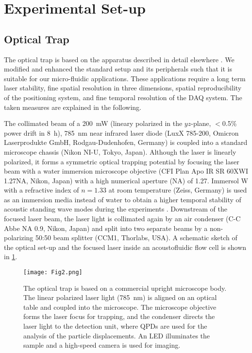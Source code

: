 \section{Experimental Set-up\label{sec:VT-experimentalSetUp}}
\subsection{Optical Trap\label{sec:VT-opticalTrap}}

The optical trap is based on the apparatus described in detail elsewhere 
\cite{Bodensiek}. We modified and enhanced the standard setup and its 
peripherals such that it is suitable for our micro-fluidic applications. These 
applications require a long term laser stability, fine spatial resolution in 
three dimensions, spatial reproducibility of the positioning system, and fine 
temporal resolution of the DAQ system. The taken measures are explained in the 
following.

The collimated beam of a \SI{200}{\milli\watt} (lineary polarized in the 
$yz$-plane, $<$0.5\% power drift in \SI{8}{\hour}), \SI{785}{\nano\meter} near 
infrared laser diode (LuxX 785-200, Omicron Laserprodukte GmbH, 
Rodgau-Dudenhofen, Germany) is coupled into a standard microscope chassis (Nikon 
NI-U, Tokyo, Japan).  Although the laser is linearly polarized, it forms a 
symmetric optical trapping potential by focusing the laser beam with a water 
immersion microscope objective (CFI Plan Apo IR SR 60XWI 1.27NA, Nikon, Japan) 
with a high numerical aperture (NA) of 1.27. Immersol W with a refractive index 
of $n=1.33$ at room temperature (Zeiss, Germany) is used as an immersion media 
instead of water to obtain a higher temporal stability of acoustic standing wave 
modes during the experiments \cite{Lamprecht2016}.  Downstream of the focused 
laser beam, the laser light is collimated again by an air condenser (C-C Abbe NA 
0.9, Nikon, Japan) and split into two separate beams by a non-polarizing 50:50 
beam splitter (CCM1, Thorlabs, USA). A schematic sketch of the optical set-up 
and the focused laser inside an acoustofluidic flow cell is shown in 
\cref{fig:Fig2}.

\begin{figure}[tb]
    \centering
    \texttt{[image: Fig2.png]}
    \caption{The optical trap is based on a commercial upright microscope body.  
        The linear polarized laser light (\SI{785}{\nano\meter}) is aligned on 
        an optical table and coupled into the microscope. The microscope 
        objective forms the laser focus for trapping, and the condenser directs 
    the laser light to the detection unit, where QPDs are used for the analysis 
  of the particle displacements. An LED illuminates the sample and a high-speed 
camera is used for imaging.\label{fig:Fig2}}
\end{figure}%

